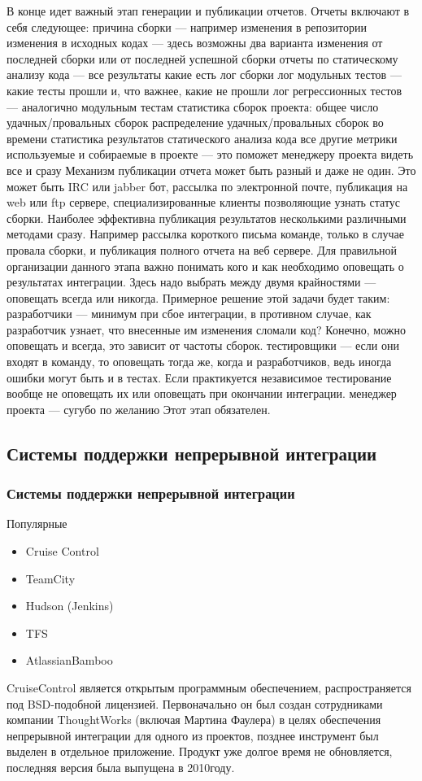 \documentclass{../industrial-development}
\begin{document}
В конце идет важный этап генерации и публикации отчетов. Отчеты включают в себя следующее:
	причина сборки — например изменения в репозитории
	изменения в исходных кодах — здесь возможны два варианта изменения от последней сборки или от последней успешной сборки
	отчеты по статическому анализу кода — все результаты какие есть
	лог сборки
	лог модульных тестов — какие тесты прошли и, что важнее, какие не прошли
	лог регрессионных тестов — аналогично модульным тестам
	статистика сборок проекта:
		общее число удачных/провальных сборок
		распределение удачных/провальных сборок во времени
		статистика результатов статического анализа кода
	все другие метрики используемые и собираемые в проекте — это поможет менеджеру проекта видеть все и сразу
Механизм публикации отчета может быть разный и даже не один. Это может быть IRC или jabber бот, рассылка по электронной почте, публикация на web или ftp сервере, специализированные клиенты позволяющие узнать статус сборки.
Наиболее эффективна публикация результатов несколькими различными методами сразу. Например рассылка короткого письма команде, только в случае провала сборки, и публикация полного отчета на веб сервере.
Для правильной организации данного этапа важно понимать кого и как необходимо оповещать о результатах интеграции. Здесь надо выбрать между двумя крайностями — оповещать всегда или никогда. Примерное решение этой задачи будет таким:
	разработчики — минимум при сбое интеграции, в противном случае, как разработчик узнает, что внесенные им изменения сломали код? Конечно, можно оповещать и всегда, это зависит от частоты сборок.
	тестировщики — если они входят в команду, то оповещать тогда же, когда и разработчиков, ведь иногда ошибки могут быть и в тестах. Если практикуется независимое тестирование вообще не оповещать их или оповещать при окончании интеграции.
	менеджер проекта — сугубо по желанию
Этот этап обязателен.
~\cite{Custis_Continuous Integration}

\subsection{Системы поддержки непрерывной интеграции}

\begin{frame} \frametitle{Системы поддержки непрерывной интеграции}
	\begin{block}{Популярные}
			\begin{itemize}
			\item Cruise Control
			\item TeamCity
			\item Hudson (Jenkins)
			\item TFS
			\item AtlassianBamboo
		\end{itemize}
	\end{block}
\end{frame}
\lecturenotes
CruiseControl является открытым программным обеспечением, распространяется под BSD-подобной лицензией. Первоначально он был создан сотрудниками компании ThoughtWorks (включая Мартина Фаулера) в целях обеспечения непрерывной интеграции для одного из проектов, позднее инструмент был выделен в отдельное приложение. Продукт уже долгое время не обновляется, последняя версия была выпущена в 2010году.
\end{document}
